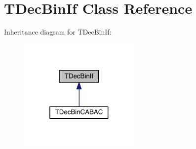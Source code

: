 \hypertarget{class_t_dec_bin_if}{}\section{T\+Dec\+Bin\+If Class Reference}
\label{class_t_dec_bin_if}


Inheritance diagram for T\+Dec\+Bin\+If\+:
\nopagebreak
\begin{figure}[H]
\begin{center}
\leavevmode
\includegraphics[width=169pt]{d3/dd9/class_t_dec_bin_if__inherit__graph}
\end{center}
\end{figure}

